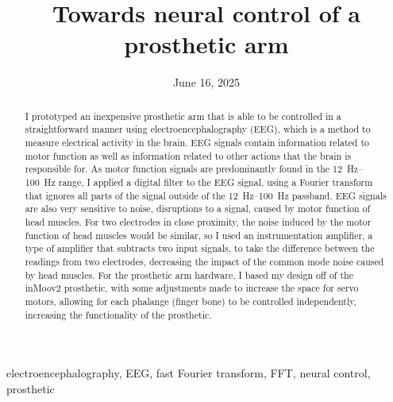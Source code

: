 ﻿\documentclass[12pt,conference,onecolumn]{IEEEtran}
\title{Towards neural control of a prosthetic arm}
\author{\IEEEauthorblockN{Vikram Choudhury}\IEEEauthorblockA{Science \& Engineering\\Manalapan High School\\Englishtown, NJ\\425vchoudhury@frhsd.com}}
\date{June 16, 2025}
\newcommand{\keywords}{electroencephalography, EEG, fast Fourier transform, FFT, neural control, prosthetic}
\begin{document}
\maketitle 

\begin{abstract}
I prototyped an inexpensive prosthetic arm that is able to be controlled in a straightforward manner using electroencephalography (EEG), which is a method to measure electrical activity in the brain. EEG signals contain information related to motor function as well as information related to other actions that the brain is responsible for. As motor function signals are predominantly found in the \qtyrange{12}{100}{\hertz} range, I applied a digital filter to the EEG signal, using a Fourier transform that ignores all parts of the signal outside of the \qtyrange{12}{100}{\hertz} passband. EEG signals are also very sensitive to noise, disruptions to a signal, caused by motor function of head muscles. For two electrodes in close proximity, the noise induced by the motor function of head muscles would be similar, so  I used an instrumentation amplifier, a type of amplifier that subtracts two input signals, to take the difference between the readings from two electrodes, decreasing the impact of the common mode noise caused by head muscles. For the prosthetic arm hardware, I based my design off of the inMoov2 prosthetic, with some adjustments made to increase the space for servo motors, allowing for each phalange (finger bone) to be controlled independently, increasing the functionality of the prosthetic.\end{abstract}

\begin{IEEEkeywords}
\keywords
\end{IEEEkeywords}
\end{document}
